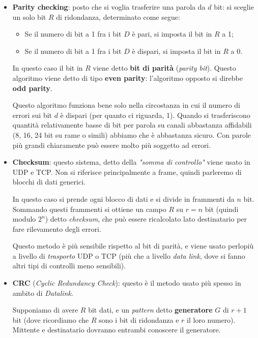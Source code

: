 \documentclass[a4paper,11pt]{article}
\begin{document}
\begin{itemize}
	\item \textbf{Parity checking}: posto che si voglia trasferire una parola da $d$ bit: si sceglie un solo bit $R$ di ridondanza, determinato come segue:
		\begin{itemize}
			\item Se il numero di bit a 1 fra i bit $D$ è pari, si imposta il bit in $R$ a 1;
			\item Se il numero di bit a 1 fra i bit $D$ è dispari, si imposta il bit in $R$ a 0.
		\end{itemize}
		In questo caso il bit in $R$ viene detto \textbf{bit di parità} (\textit{parity bit}). Questo algoritmo viene detto di tipo \textbf{even parity}: l'algoritmo opposto si direbbe \textbf{odd parity}.

		Questo algoritmo funziona bene solo nella circostanza in cui il numero di errori sui bit $d$ è dispari (per quanto ci riguarda, 1). Quando si trasferiscono quantità relativamente basse di bit per parola su canali abbastanza affidabili (8, 16, 24 bit su rame o simili) abbiamo che è abbastanza sicuro. Con parole più grandi chiaramente può essere molto più soggetto ad errori.

	\item \textbf{Checksum}: questo sistema, detto della \textit{"somma di controllo"} viene usato in UDP e TCP. Non si riferisce principalmente a frame, quindi parleremo di blocchi di dati generici.

		In questo caso si prende ogni blocco di dati e si divide in frammenti da $n$ bit. Sommando questi frammenti si ottiene un campo $R$ su $r= n$ bit (quindi modulo $2^n$) detto \textit{checksum}, che può essere ricalcolato lato destinatario per fare rilevamento degli errori.

		Questo metodo è più sensibile rispetto al bit di parità, e viene usato perlopiù a livello di \textit{trasporto} UDP o TCP (più che a livello \textit{data link}, dove si fanno altri tipi di controlli meno sensibili).

	\item \textbf{CRC} (\textit{Cyclic Redundancy Check}): questo è il metodo usato più spesso in ambito di \textit{Datalink}.

		Supponiamo di avere $R$ bit dati, e un \textit{pattern} detto \textbf{generatore} $G$ di $r + 1$ bit (dove ricordiamo che $R$ sono i bit di ridondanza e $r$ il loro numero). Mittente e destinatario dovranno entrambi conoscere il generatore.


\end{itemize}
\end{document}

